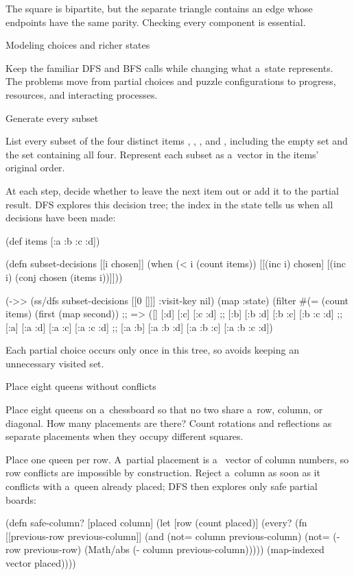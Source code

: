 {The square is bipartite, but the separate triangle contains an edge whose
endpoints have the same parity. Checking every component is essential.

\sec Modeling choices and richer states

Keep the familiar DFS and BFS calls while changing what a~state represents.
The problems move from partial choices and puzzle configurations to progress,
resources, and interacting processes.

\secc Generate every subset

 List every subset of the four distinct items
, , , and , including the empty set and
the set containing all four. Represent each subset as a~vector in the
items' original order.

\smallskip
{} At each step, decide whether to leave the next
item out or add it to the partial result. DFS explores this decision tree;
the index in the state tells us when all decisions have been made:

\begtt {}
(def items [:a :b :c :d])

(defn subset-decisions [[i chosen]]
  (when (< i (count items))
    [[(inc i) chosen]
     [(inc i) (conj chosen (items i))]]))

(->> (ss/dfs subset-decisions [[0 []]] {:visit-key nil})
     (map :state)
     (filter #(= (count items) (first %
     (map second))
;; => ([] [:d] [:c] [:c :d]
;;     [:b] [:b :d] [:b :c] [:b :c :d]
;;     [:a] [:a :d] [:a :c] [:a :c :d]
;;     [:a :b] [:a :b :d] [:a :b :c] [:a :b :c :d])
\endtt

Each partial choice occurs only once in this tree, so
 avoids keeping an unnecessary visited set.

\secc Place eight queens without conflicts

 Place eight queens on a~chessboard
so that no two share a~row, column, or diagonal. How many placements are
there? Count rotations and reflections as separate placements when they
occupy different squares.

\smallskip
{} Place one queen per row. A~partial placement is a~
vector of column numbers, so row conflicts are impossible by construction.
Reject a~column as soon as it conflicts with a~queen already placed; DFS
then explores only safe partial boards:

\begtt {}
(defn safe-column? [placed column]
  (let [row (count placed)]
    (every? (fn [[previous-row previous-column]]
              (and (not= column previous-column)
                   (not= (- row previous-row)
                         (Math/abs (- column previous-column)))))
            (map-indexed vector placed))))

}
